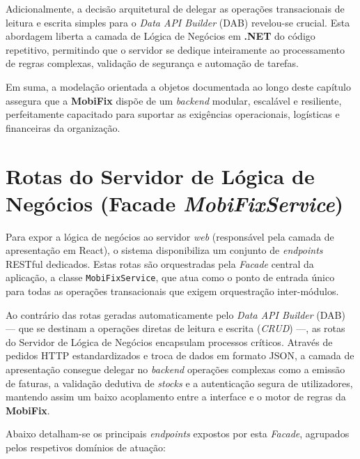 \documentclass[a4paper,12pt]{scrreprt}
\begin{document}
Adicionalmente, a decisão arquitetural de delegar as operações transacionais de leitura e escrita simples para o \textit{Data API Builder} (DAB) revelou-se crucial. Esta abordagem liberta a camada de Lógica de Negócios em \textbf{.NET} do código repetitivo, permitindo que o servidor se dedique inteiramente ao processamento de regras complexas, validação de segurança e automação de tarefas.

Em suma, a modelação orientada a objetos documentada ao longo deste capítulo assegura que a \textbf{MobiFix} dispõe de um \textit{backend} modular, escalável e resiliente, perfeitamente capacitado para suportar as exigências operacionais, logísticas e financeiras da organização.

\section{Rotas do Servidor de Lógica de Negócios (Facade \textit{MobiFixService})}

Para expor a lógica de negócios ao servidor \textit{web} (responsável pela camada de apresentação em React), o sistema disponibiliza um conjunto de \textit{endpoints} RESTful dedicados. Estas rotas são orquestradas pela \textit{Facade} central da aplicação, a classe \texttt{MobiFixService}, que atua como o ponto de entrada único para todas as operações transacionais que exigem orquestração inter-módulos.

Ao contrário das rotas geradas automaticamente pelo \textit{Data API Builder} (DAB) — que se destinam a operações diretas de leitura e escrita (\textit{CRUD}) —, as rotas do Servidor de Lógica de Negócios encapsulam processos críticos. Através de pedidos HTTP estandardizados e troca de dados em formato JSON, a camada de apresentação consegue delegar no \textit{backend} operações complexas como a emissão de faturas, a validação dedutiva de \textit{stocks} e a autenticação segura de utilizadores, mantendo assim um baixo acoplamento entre a interface e o motor de regras da \textbf{MobiFix}.

Abaixo detalham-se os principais \textit{endpoints} expostos por esta \textit{Facade}, agrupados pelos respetivos domínios de atuação:
\end{document}
